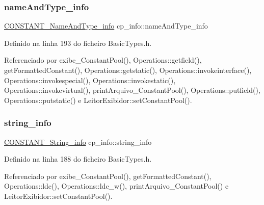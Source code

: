 \mbox{\label{structcp__info_a1e020df4bc85c0a41365a8bb466f8781}} 
\subsubsection{\texorpdfstring{name\+And\+Type\+\_\+info}{nameAndType\_info}}
{\footnotesize\ttfamily \hyperlink{structCONSTANT__NameAndType__info}{C\+O\+N\+S\+T\+A\+N\+T\+\_\+\+Name\+And\+Type\+\_\+info} cp\+\_\+info\+::name\+And\+Type\+\_\+info}



Definido na linha 193 do ficheiro Basic\+Types.\+h.



Referenciado por exibe\+\_\+\+Constant\+Pool(), Operations\+::getfield(), get\+Formatted\+Constant(), Operations\+::getstatic(), Operations\+::invokeinterface(), Operations\+::invokespecial(), Operations\+::invokestatic(), Operations\+::invokevirtual(), print\+Arquivo\+\_\+\+Constant\+Pool(), Operations\+::putfield(), Operations\+::putstatic() e Leitor\+Exibidor\+::set\+Constant\+Pool().

\mbox{\label{structcp__info_a4d1d5a06448e8b86b4b23608d64cfe7e}} 
\subsubsection{\texorpdfstring{string\+\_\+info}{string\_info}}
{\footnotesize\ttfamily \hyperlink{structCONSTANT__String__info}{C\+O\+N\+S\+T\+A\+N\+T\+\_\+\+String\+\_\+info} cp\+\_\+info\+::string\+\_\+info}



Definido na linha 188 do ficheiro Basic\+Types.\+h.



Referenciado por exibe\+\_\+\+Constant\+Pool(), get\+Formatted\+Constant(), Operations\+::ldc(), Operations\+::ldc\+\_\+w(), print\+Arquivo\+\_\+\+Constant\+Pool() e Leitor\+Exibidor\+::set\+Constant\+Pool().

\mbox{\label{structcp__info_a045b8801a6e96a2a31d3b62ea684f141}} 
